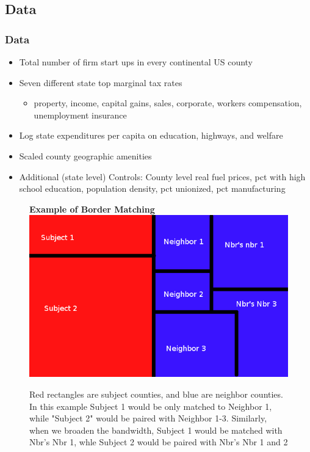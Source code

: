\documentclass{beamer}
\begin{document}
\begin{frame}
\section{Data}
\frametitle{Data}
\begin{itemize}
\item Total number of firm start ups in every continental US county
\item Seven different state top marginal tax rates
\begin{itemize}
\item property, income, capital gains, sales, corporate, workers compensation, unemployment insurance
\end{itemize}
\item Log state expenditures per capita on education, highways, and welfare
\item Scaled county geographic amenities
\item Additional (state level) Controls: County level real fuel prices, pct with high school  education, population density, pct unionized, pct manufacturing
\end{itemize}
\end{frame}

\begin{frame}
\begin{figure}[h]\label{rb}
    \centering
    \textbf{Example of Border Matching}
    \includegraphics[scale = 0.35]{../../analysis/output/borders_temp.png}
    \caption{Red rectangles are subject counties, and blue are neighbor counties. In this example Subject 1 would be only matched to Neighbor 1, while "Subject 2" would be paired with Neighbor 1-3. Similarly, when we broaden the bandwidth, Subject 1 would be matched with Nbr's Nbr 1, whle Subject 2 would be paired with Nbr's Nbr 1 and 2}
\end{figure}
\end{frame}
\end{document}

